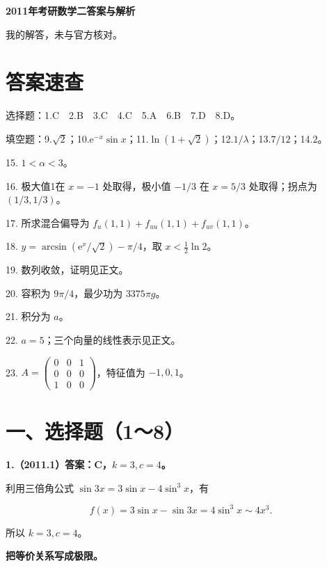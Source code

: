 \documentclass[UTF8,11pt,fontset=windows]{ctexart}
\begin{document}
{\LARGE\bfseries 2011年考研数学二答案与解析\par}\vspace{6pt}

\begingroup\color{gray}我的解答，未与官方核对。\par\endgroup

\section*{答案速查}

\begingroup\color{gray}选择题：1.C　2.B　3.C　4.C　5.A　6.B　7.D　8.D。\par\endgroup

\begingroup\color{gray}填空题：9.$\sqrt2$；10.$\mathrm e^{-x}\sin x$；11.$\ln(1+\sqrt2)$；12.$1/\lambda$；13.$7/12$；14.$2$。\par\endgroup

15. $1<\alpha<3$。

16. 极大值1在 $x=-1$ 处取得，极小值 $-1/3$ 在 $x=5/3$ 处取得；拐点为 $(1/3,1/3)$。

17. 所求混合偏导为 $f_u(1,1)+f_{uu}(1,1)+f_{uv}(1,1)$。

18. $y=\arcsin(\mathrm e^x/\sqrt2)-\pi/4$，取 $x<\frac12\ln2$。

19. 数列收敛，证明见正文。

20. 容积为 $9\pi/4$，最少功为 $3375\pi g$。

21. 积分为 $a$。

22. $a=5$；三个向量的线性表示见正文。

23. $A=\begin{pmatrix}0&0&1\\0&0&0\\1&0&0\end{pmatrix}$，特征值为 $-1,0,1$。

\clearpage

\section*{一、选择题（1～8）}

\textbf{1.（2011.1）答案：C，$k=3,c=4$。}

利用三倍角公式 $\sin3x=3\sin x-4\sin^3x$，有

$$
f(x)=3\sin x-\sin3x=4\sin^3x\sim4x^3.
$$

所以 $k=3,c=4$。

\textbf{把等价关系写成极限。}
\end{document}
